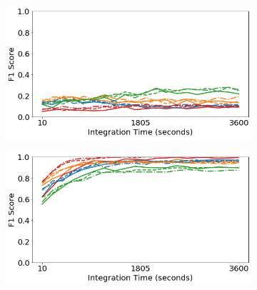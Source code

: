 \begin{figure}[H]
     \centering
     \begin{subfigure}[b]{0.49\textwidth}
         \centering
         \includegraphics[width=\textwidth]{images/generalization-height-easy-01.png}
         \caption{}
         \label{fig:generalization-height-easy-01}
     \end{subfigure}
     \hfill
     \begin{subfigure}[b]{0.49\textwidth}
         \centering
         \includegraphics[width=\textwidth]{images/generalization-height-easy-05.png}
         \caption{}
         \label{fig:generalization-height-easy-05}
     \end{subfigure}


\end{figure}
